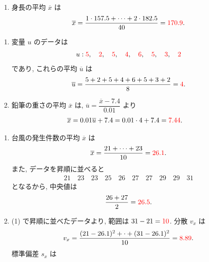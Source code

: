 \begin{qenumerate}
{\begin{enumerate}
{\begin{figure}[H]
				\end{figure}
			}
			\item{
				身長の平均 $\overline{x}$ は
				\begin{align}
					\overline{x} = \frac{1\cdot 157.5 + \cdots + 2\cdot 182.5}{40} = \textcolor{red}{170.9}.
				\end{align}
			}
		\end{enumerate}
	}
	\item{
		\begin{enumerate}
			\item{
				変量 $u$ のデータは
				\begin{align}
					u: \textcolor{red}{5}, \quad \textcolor{red}{2}, \quad \textcolor{red}{5}, \quad \textcolor{red}{4}, \quad \textcolor{red}{6}, \quad \textcolor{red}{5}, \quad \textcolor{red}{3}, \quad \textcolor{red}{2}
				\end{align}
				であり, これらの平均 $\overline{u}$ は
				\begin{align}
					\overline{u} = \frac{5 + 2 + 5 + 4 + 6 + 5 + 3 + 2}{8} = \textcolor{red}{4}.
				\end{align}
			}
			\item{
				鉛筆の重さの平均 $\overline{x}$ は, $\overline{u} = \dfrac{\overline{x} - 7.4}{0.01}$ より
				\begin{align}
					\overline{x} &= 0.01\overline{u} + 7.4 = 0.01\cdot 4 + 7.4 = \textcolor{red}{7.44}.
				\end{align}
			}
		\end{enumerate}
	}
	\item{
		\begin{enumerate}
			\item{
				台風の発生件数の平均 $\overline{x}$ は
				\begin{align}
					\overline{x} = \frac{21 + \cdots + 23}{10} = \textcolor{red}{26.1}.
				\end{align}
				また, データを昇順に並べると
				\begin{align}
					21\quad 23\quad 23\quad 25\quad 26\quad 27\quad 27\quad 29\quad 29\quad 31
				\end{align}
				となるから, 中央値は
				\begin{align}
					\frac{26 + 27}{2} = \textcolor{red}{26.5}.
				\end{align}
			}
			\item{
				(1) で昇順に並べたデータより, 範囲は $31 - 21 = \textcolor{red}{10}$.
				分散 $v_{x}$ は
				\begin{align}
					v_{x} = \frac{(21 - 26.1)^{2} + \cdot + (31 - 26.1)^{2}}{10} = \textcolor{red}{8.89}.
				\end{align}
				標準偏差 $s_{x}$ は
				\begin{align}

\end{align}}
\end{enumerate}}
\end{qenumerate}
